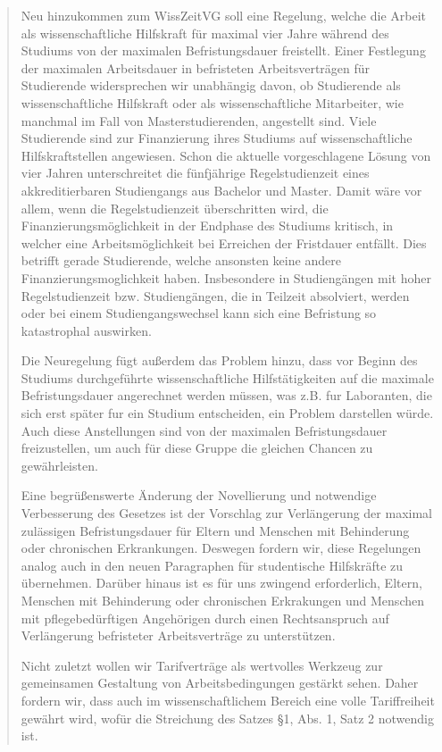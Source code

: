 \documentclass[parskip, 10pt,oneside]{scrartcl}
\begin{document}
\begin{quote}
Neu hinzukommen zum WissZeitVG soll eine Regelung, welche die Arbeit als wissenschaftliche Hilfskraft für maximal vier Jahre während des Studiums von der maximalen Befristungsdauer freistellt.
Einer Festlegung der maximalen Arbeitsdauer in befristeten Arbeitsverträgen für Studierende widersprechen wir unabhängig davon, ob Studierende als wissenschaftliche Hilfskraft oder als wissenschaftliche Mitarbeiter, wie manchmal im Fall von Masterstudierenden, angestellt sind. 
Viele Studierende sind zur Finanzierung ihres Studiums auf wissenschaftliche Hilfskraftstellen angewiesen. Schon die aktuelle vorgeschlagene Lösung von vier Jahren unterschreitet die fünfjährige Regelstudienzeit eines akkreditierbaren Studiengangs aus Bachelor und Master. Damit wäre vor allem, wenn die Regelstudienzeit überschritten wird, die Finanzierungsmöglichkeit in der Endphase des Studiums kritisch, in welcher eine Arbeitsmöglichkeit bei Erreichen der Fristdauer entfällt. Dies betrifft gerade Studierende, welche ansonsten keine andere Finanzierungsmoglichkeit haben. Insbesondere in Studiengängen mit hoher Regelstudienzeit bzw. Studiengängen, die in Teilzeit absolviert, werden oder bei einem Studiengangswechsel kann sich eine Befristung so katastrophal auswirken.

Die Neuregelung fügt außerdem das Problem hinzu, dass vor Beginn des Studiums durchgeführte wissenschaftliche Hilfstätigkeiten auf die maximale Befristungsdauer angerechnet werden müssen, was z.B. fur Laboranten, die sich erst später fur ein Studium entscheiden, ein Problem darstellen würde.
Auch diese Anstellungen sind von der maximalen Befristungsdauer freizustellen, um auch für diese Gruppe die gleichen Chancen zu gewährleisten.

Eine begrüßenswerte Änderung der Novellierung und notwendige Verbesserung des Gesetzes ist der Vorschlag zur Verlängerung der maximal zulässigen Befristungsdauer für Eltern und Menschen mit Behinderung oder chronischen Erkrankungen. Deswegen fordern wir, diese Regelungen analog auch in den neuen Paragraphen für studentische Hilfskräfte zu übernehmen. 
Darüber hinaus ist es für uns zwingend erforderlich, Eltern, Menschen mit Behinderung oder chronischen Erkrakungen und Menschen mit pflegebedürftigen Angehörigen durch einen Rechtsanspruch auf Verlängerung befristeter Arbeitsverträge zu unterstützen.

Nicht zuletzt wollen wir Tarifverträge als wertvolles Werkzeug zur gemeinsamen Gestaltung von Arbeitsbedingungen gestärkt sehen. Daher fordern wir, dass auch im wissenschaftlichem Bereich eine volle Tariffreiheit gewährt wird, wofür die Streichung des Satzes §1, Abs. 1, Satz 2 notwendig ist.



\end{quote}
\end{document}
